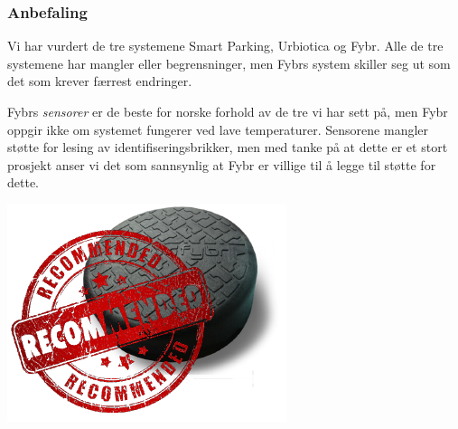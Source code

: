 \documentclass[xetex]{beamer}
\begin{document}
\begin{frame}\label{fr:anbefalning}
	\frametitle{Anbefaling}
	Vi har vurdert de tre systemene Smart Parking, Urbiotica og Fybr. Alle de tre systemene har mangler eller begrensninger, men \alert{Fybrs} system skiller seg ut som det som krever færrest endringer.
	
	Fybrs \emph{sensorer} er de \alert{beste for norske forhold} av de tre vi har sett på, men Fybr oppgir ikke om systemet fungerer ved lave temperaturer. Sensorene mangler støtte for lesing av identifiseringsbrikker, men med tanke på at dette er et stort prosjekt anser vi det som sannsynlig at Fybr er villige til å legge til støtte for dette.
	
	\vspace{2em}
	
	\hfill\includegraphics[scale=1.0]{grafikk/recomended.pdf}
\end{frame}
\end{document}
